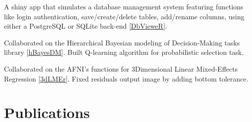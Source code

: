\documentclass[]{plushcv}
\begin{document}
\begin{minipage}[t]{0.70\textwidth}
\begin{tightemize}
\item A shiny app that simulates a database management system featuring functions like login authentication, save/create/delete tables, add/rename columns, using either a PostgreSQL or SQLite back-end [\href{https://github.com/munoztd0/DBMS}{\underline{DbVieweR}}].
\end{tightemize}
\sectionsep
{}
\begin{tightemize}
\item Collaborated on the Hierarchical Bayesian modeling of Decision-Making tasks library [\href{https://github.com/CCS-Lab/hBayesDM}{\underline{hBayesDM}}]. Built Q-learning algorithm for probabilistic selection task.
\end{tightemize}
\sectionsep



\begin{tightemize}
\item Collaborated on the AFNI's functions for 3Dimensional Linear Mixed-Effects Regression [\href{https://github.com/afni/afni/blob/ebd2aef51c27cf7684f38f580e1db832b1ccf621/src/R_scripts/3dLMEr.R}{\underline{3dLMEr}}]. Fixed residuals output image by adding bottom tolerance.
\end{tightemize}
\sectionsep






\section{Publications} 


\sectionsep


\end{minipage}
\end{document}
